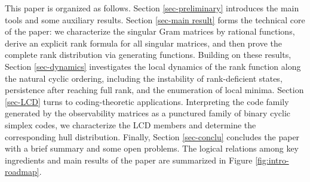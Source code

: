 \documentclass[hidelinks,onefignum,onetabnum]{siamart251216}
\theoremstyle{definition}
\theoremstyle{remark}
\begin{document}
This paper is organized as follows. Section \ref{sec-preliminary} introduces the main tools and some auxiliary results. Section \ref{sec-main result} forms the technical core of the paper: we characterize the singular Gram matrices by rational functions, derive an explicit rank formula for all singular matrices, and then prove the complete rank distribution via generating functions. Building on these results, Section \ref{sec-dynamics} investigates the local dynamics of the rank function along the natural cyclic ordering, including the instability of rank-deficient states, persistence after reaching full rank, and the enumeration of local minima. Section \ref{sec-LCD} turns to coding-theoretic applications. Interpreting the code family generated by the observability matrices as a punctured family of binary cyclic simplex codes, we characterize the LCD members and determine the corresponding hull distribution. Finally, Section \ref{sec-conclu} concludes the paper with a brief summary and some open problems. The logical relations among key ingredients and main results of the paper are summarized in Figure \ref{fig:intro-roadmap}.



\end{document}
